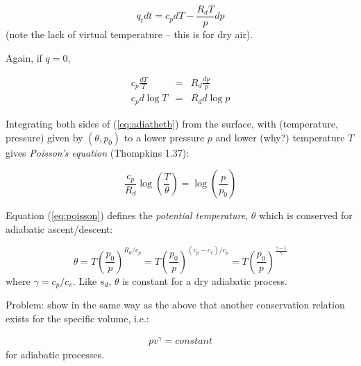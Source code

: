 \documentclass[12pt]{article}
\begin{document}
\begin{equation}
  \label{eq:poten1}
  q_t dt = c_p dT - \frac{R_d T}{p} dp
\end{equation}
(note the lack of virtual temperature -- this is for dry air).

Again, if $q=0$, 

\begin{subequations}
\begin{eqnarray}
  \label{eq:adiathet}
  c_p \frac{dT}{T} &=& R_d \frac{dp}{p}\\
  c_p  d\log{T} &=& R_d d \log {p}\label{eq:adiathetb}
\end{eqnarray}
\end{subequations}

   Integrating both sides of (\ref{eq:adiathetb}) from the
surface, with (temperature, pressure) given by $(\theta, p_0)$
to a lower pressure $p$ and lower (why?) temperature $T$
gives  \textit{Poisson's equation} (Thompkins 1.37):

\begin{equation}
  \label{eq:poisson}
  \frac{c_p}{R_d} \log \left ( \frac{T}{\theta} \right ) = \log \left ( \frac{p}{p_0} \right )
\end{equation}


Equation (\ref{eq:poisson}) defines the \textit{potential temperature}, $\theta$
which is conserved for adiabatic ascent/descent:

\begin{equation}
  \label{eq:pottemp}
  \theta =  T \left ( \frac{p_0}{p} \right )^{R_d/c_p} =
 T \left ( \frac{p_0}{p} \right )^{(c_p - c_v)/c_p} =  
 T \left ( \frac{p_0}{p} \right )^{\frac{\gamma - 1}{\gamma}} 
\end{equation}
where $\gamma = c_p/c_v$.  Like $s_d$, $\theta$ is constant for a dry adiabatic process.

 Problem:  show in the same way as the above that another conservation
relation exists for the specific volume, i.e.:

\begin{eqnarray}
  \label{eq:specvol}
  p v^\gamma = constant
\end{eqnarray}
for adiabatic processes.
\end{document}
